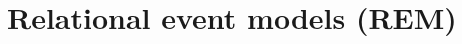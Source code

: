 \documentclass[mscthesis]{usiinfthesis}
\begin{document}
%
%
%
%
%

\section{Relational event models (REM)}
\label{background:rem}
\end{document}
